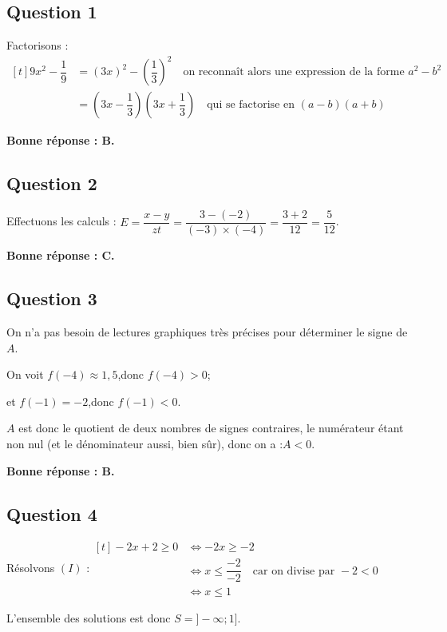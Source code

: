 \subsection*{Question 1}
	Factorisons :\quad $\begin{aligned}[t]
		9x^2 - \dfrac{1}{9} &= (3x)^2 - \left(\dfrac{1}{3}\right)^2 \quad \text{on reconnaît alors une expression de la forme } a^2 - b^2\\
		&=\left(3x - \dfrac{1}{3}\right)\left(3x + \dfrac{1}{3}\right) \quad \text{qui se factorise en } (a - b)(a + b)
	\end{aligned}$

	\textbf{Bonne réponse : B.}

\subsection*{Question 2}
	Effectuons les calculs : \quad $E = \dfrac{x - y}{zt} = \dfrac{3 - (-2)}{(-3)\times(-4)} = \dfrac{3 + 2}{12} = \dfrac{5}{12}$.

	\textbf{Bonne réponse : C.}

\subsection*{Question 3}
On n'a pas besoin de lectures graphiques très précises pour déterminer le signe de $A$.

On voit \quad $f(-4) \approx 1,5$,\quad donc \quad $f(-4)>0$;

et \quad $f(-1) = -2$,\quad donc \quad $f(-1) < 0$.

$A$ est donc le quotient de deux nombres de signes contraires, le numérateur étant non nul (et le dénominateur aussi, bien sûr), donc on a :\quad $A < 0$.

\textbf{Bonne réponse : B.}

\subsection*{Question 4}
	Résolvons $(I)$ :\quad $\begin{aligned}[t] -2x + 2 \geqslant 0
		&\iff -2x \geqslant -2\\
		&\iff x \leqslant \dfrac{-2}{-2}\quad \text{car on divise par } -2 < 0\\
		&\iff x \leqslant 1
	\end{aligned}$

	L'ensemble des solutions est donc $S = ]-\infty ; 1]$.


